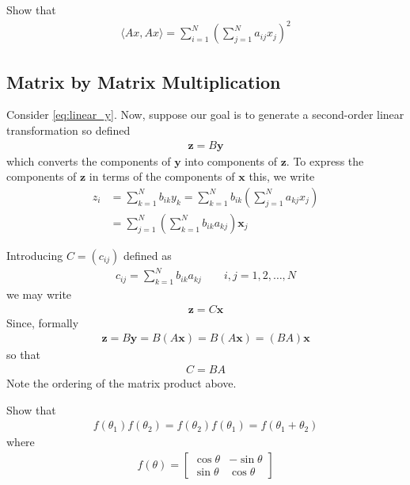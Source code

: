 \begin{homework}
	Show that 
	\begin{align}
		\langle Ax, Ax \rangle = \sum_{i=1}^{N} \left(\sum_{j=1}^{N} a_{ij}x_j\right)^2
	\end{align}
\end{homework}

\subsection{Matrix by Matrix Multiplication}

Consider \eqref{eq:linear_y}. Now, suppose our goal is to generate a second-order linear transformation so defined 
%
\begin{align}
	\bm{z} = B\bm{y}
\end{align}
%
which converts the components of $\bm{y}$ into components of $\bm{z}$. To express the components of $\bm{z}$ in terms of the components of $\bm{x}$ this, we write
%
\begin{align}
	z_i &= \sum_{k=1}^{N} b_{ik} y_k = \sum_{k=1}^{N} b_{ik} \left(\sum_{j=1}^{N}a_{kj}x_j\right) \\
	&= \sum_{j=1}^{N} \left(\sum_{k=1}^{N}b_{ik}a_{kj}\right)\bm{x}_j
\end{align}

Introducing $C=\left(c_{ij}\right)$ defined as 
%
\begin{align}
	c_{ij} = \sum_{k=1}^{N} b_{ik} a_{kj} \qquad i,j = 1,2,\ldots,N
\end{align}
%
we may write 
%
\begin{align}
	\bm{z} = C \bm{x}
\end{align}
%
Since, formally
%
\begin{align}
	\bm{z} = B\bm{y} = B(A\bm{x}) = B(A\bm{x}) = (BA) \bm{x}
\end{align}
%
so that 
%
\begin{align}
	C = BA
\end{align}
%
Note the ordering of the matrix product above.
%
\begin{homework}
	Show that 
	\begin{align}
		f(\theta_1) f(\theta_2) = f(\theta_2) f(\theta_1) = f(\theta_1 + \theta_2)
	\end{align}
	where 
	\begin{align}
		f(\theta) = \begin{bmatrix}
		\cos \theta & -\sin \theta \\
		\sin  \theta & \cos \theta
		\end{bmatrix}
	\end{align}
\end{homework}

